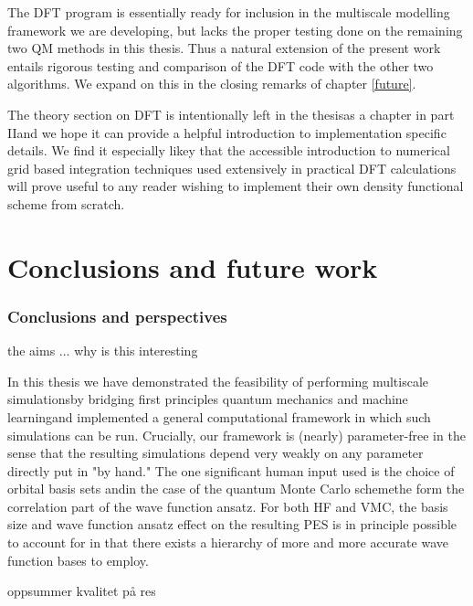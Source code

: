 \documentclass[twoside,english]{uiofysmaster}
\begin{document}
The DFT program is essentially ready for inclusion in the multiscale modelling framework we are developing, but lacks the proper testing done on the remaining two QM methods in this thesis. Thus a natural extension of the present work entails rigorous testing and comparison of the DFT code with the other two algorithms. We expand on this in the closing remarks of chapter \ref{future}.

The theory section on DFT is intentionally left in the thesis\textemdash as a chapter in part II\textemdash and we hope it can provide a helpful introduction to implementation specific details. We find it especially likey that the accessible introduction to numerical grid based integration techniques used extensively in practical DFT calculations will prove useful to any reader wishing to implement their own density functional scheme from scratch.





\part{Conclusions and future work \label{future}}
\section{Conclusions and perspectives}
the aims ...
why is this interesting


In this thesis we have demonstrated the feasibility of performing multiscale simulations\textemdash by bridging first principles quantum mechanics and machine learning\textemdash and implemented a general computational framework in which such simulations can be run. Crucially, our framework is (nearly) parameter-free in the sense that the resulting simulations depend very weakly on any parameter directly put in "by hand." The one significant human input used is the choice of orbital basis sets and\textemdash in the case of the quantum Monte Carlo scheme\textemdash the form the correlation part of the wave function ansatz. For both HF and VMC, the basis size and wave function ansatz effect on the resulting PES is in principle possible to account for in that there exists a hierarchy of more and more accurate wave function bases to employ. 


oppsummer kvalitet på res
\end{document}
